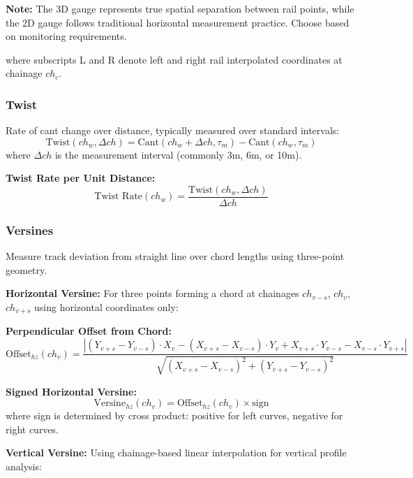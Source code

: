 \documentclass{article}
\begin{document}
\textbf{Note:} The 3D gauge represents true spatial separation between rail points, while the 2D gauge follows traditional horizontal measurement practice. Choose based on monitoring requirements.

where subscripts L and R denote left and right rail interpolated coordinates at chainage $ch_c$.

\subsubsection{Twist}
Rate of cant change over distance, typically measured over standard intervals:
\begin{equation}
\text{Twist}(ch_w, \Delta ch) = \text{Cant}(ch_w + \Delta ch, \tau_m) - \text{Cant}(ch_w, \tau_m)
\end{equation}
where $\Delta ch$ is the measurement interval (commonly 3m, 6m, or 10m).

\textbf{Twist Rate per Unit Distance:}
\begin{equation}
\text{Twist Rate}(ch_w) = \frac{\text{Twist}(ch_w, \Delta ch)}{\Delta ch}
\end{equation}

\subsubsection{Versines}
Measure track deviation from straight line over chord lengths using three-point geometry.

\textbf{Horizontal Versine:}
For three points forming a chord at chainages $ch_{v-s}$, $ch_v$, $ch_{v+s}$ using horizontal coordinates only:

\textbf{Perpendicular Offset from Chord:}
\begin{equation}
\text{Offset}_{hz}(ch_v) = \frac{|(Y_{v+s} - Y_{v-s}) \cdot X_v - (X_{v+s} - X_{v-s}) \cdot Y_v + X_{v+s} \cdot Y_{v-s} - X_{v-s} \cdot Y_{v+s}|}{\sqrt{(X_{v+s} - X_{v-s})^2 + (Y_{v+s} - Y_{v-s})^2}}
\end{equation}

\textbf{Signed Horizontal Versine:}
\begin{equation}
\text{Versine}_{hz}(ch_v) = \text{Offset}_{hz}(ch_v) \times \text{sign}
\end{equation}
where sign is determined by cross product: positive for left curves, negative for right curves.

\textbf{Vertical Versine:}
Using chainage-based linear interpolation for vertical profile analysis:
\end{document}
